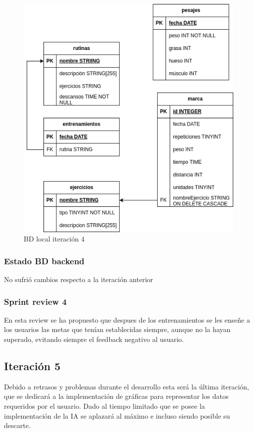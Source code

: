 \begin{figure}[H]
    \centering
    \includegraphics[width=\textwidth]{fotos/BDL iteracion 4.png}
    \caption{BD local iteración 4}
    \label{fig:BDL iteracion 4}
\end{figure}

\subsubsection{Estado BD backend}

No sufrió cambios respecto a la iteración anterior

\subsubsection{Sprint review 4}

En esta review se ha propuesto que despues de los entrenamientos se les enseñe a los usuarios las metas que tenían establecidas siempre, aunque no la hayan superado, evitando siempre el feedback negativo al usuario.

\subsection{Iteraci\'on 5}

Debido a retrasos y problemas durante el desarrollo esta será la última iteración, que se dedicará a la implementación de gráficas para representar los datos requeridos por el usuario. Dado al tiempo limitado que se posee la implementación de la IA se aplazará al máximo e incluso siendo posible su descarte.